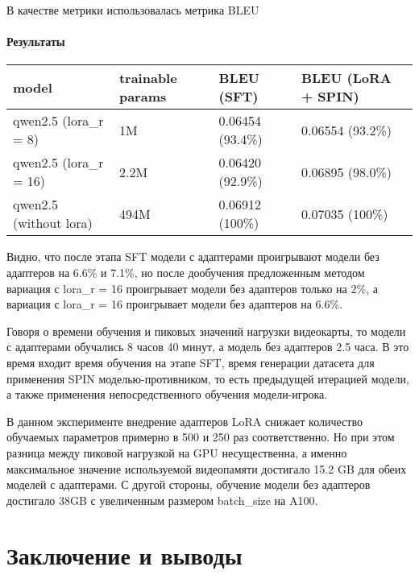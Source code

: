 \documentclass[12pt, twoside]{article}
\begin{document}
В качестве метрики использовалась метрика BLEU

\paragraph{Результаты}

\vspace{10}

\begin{tabular}{l|l|l|l|}
model                  & trainable params & BLEU (SFT)       & BLEU (LoRA + SPIN) \\ \hline
qwen2.5 (lora\_r = 8)  & 1M               & 0.06454 (93.4\%) & 0.06554 (93.2\%)   \\ \hline
qwen2.5 (lora\_r = 16) & 2.2M             & 0.06420 (92.9\%) & 0.06895 (98.0\%)   \\ \hline
qwen2.5 (without lora) & 494M             & 0.06912 (100\%)  & 0.07035 (100\%)    \\ \hline
\end{tabular}

\vspace{10}

Видно, что после этапа SFT модели с адаптерами проигрывают модели без адаптеров на 6.6\% и 7.1\%, но после дообучения предложенным методом вариация с lora\_r = 16 проигрывает модели без адаптеров только на 2\%, а вариация с lora\_r = 16 проигрывает модели без адаптеров на 6.6\%.

Говоря о времени обучения и пиковых значений нагрузки видеокарты, то модели с адаптерами обучались 8 часов 40 минут, а модель без адаптеров 2.5 часа. В это время входит время обучения на этапе SFT, время генерации датасета для применения SPIN моделью-противником, то есть предыдущей итерацией модели, а также применения непосредственного обучения модели-игрока.

В данном эксперименте внедрение адаптеров LoRA снижает количество обучаемых параметров примерно в 500 и 250 раз соответственно. Но при этом разница между пиковой нагрузкой на GPU несущественна, а именно максимальное значение используемой видеопамяти достигало 15.2 GB для обеих моделей с адаптерами. С другой стороны, обучение модели без адаптеров достигало 38GB с увеличенным размером batch\_size на A100.

\section{Заключение и выводы}
\end{document}
